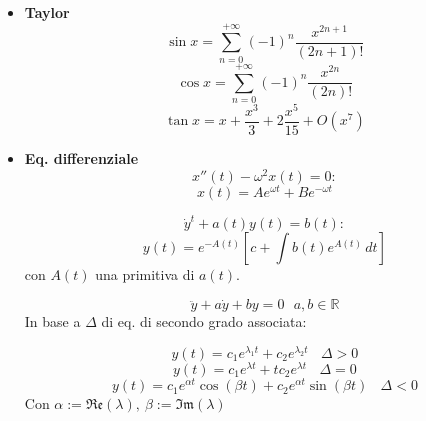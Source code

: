 \documentclass{article}
\newcommand{\re}{\mathfrak{Re}}
\newcommand{\im}{\mathfrak{Im}}
\begin{document}
\begin{small}
\begin{multicols*}{3}
\begin{itemize}[leftmargin=*]
	\item \textbf{Taylor}
		\[\sin x = \sum_{n=0}^{+\infty }(-1)^n \frac{x^{2n+1}}{(2n+1)!}\]
		\[\cos x = \sum_{n=0}^{+\infty }(-1)^n \frac{x^{2n}}{(2n)!}\]
		\[\tan x = x + \frac{x^3}{3} + 2\frac{x^5}{15} + O(x^7)\]

	\item \textbf{Eq. differenziale}
		\[x''(t)-\omega ^2x(t) = 0:\]
		\[x(t) = Ae^{\omega t} + Be^{-\omega t}\]

		\[\dot{y}^t + a(t)y(t) = b(t):\]
		\[y(t) = e^{-A(t)}\left[c+ \int b(t)e^{A(t)}\,dt\right]\]
		con $A(t)$ una primitiva di $a(t)$.

		\[\ddot{y} + a\dot{y} + by = 0\ \ \ a,b\in \mathbb{R}\]
		In base a $\Delta $ di eq. di secondo grado associata:

		\[y(t) = c_1e^{\lambda _1t} + c_2e^{\lambda _2t} \ \ \ \  \Delta >0\]
		\[y(t) = c_1e^{\lambda t} + tc_2e^{\lambda t} \ \ \ \  \Delta =0\]
		\[y(t) = c_1e^{\alpha  t}\cos(\beta t) + c_2e^{\alpha  t}\sin(\beta t) \ \ \  \ \Delta <0\]
		Con $\alpha := \re(\lambda ),\ \beta :=\im(\lambda )$
\end{itemize}
\end{multicols*}
\end{small}
\end{document}

